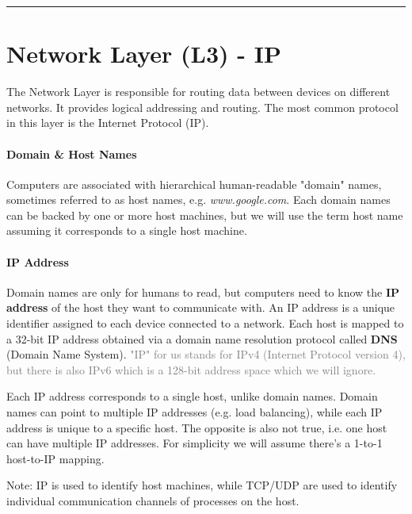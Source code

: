 \documentclass[openany,12pt]{book}
\newcommand{\gray}[1]{\textcolor{gray}{#1}}
\begin{document}
\noindent\rule{\linewidth}{0.5pt}



\section*{Network Layer (L3) - IP}

The Network Layer is responsible for routing data between devices on different networks. It provides logical addressing and routing. The most common protocol in this layer is the Internet Protocol (IP).

\paragraph{Domain \& Host Names} Computers are associated with hierarchical human-readable "domain" names, sometimes referred to as host names, e.g. \textit{www.google.com}. Each domain names can be backed by one or more host machines, but we will use the term host name assuming it corresponds to a single host machine.


\paragraph{IP Address} Domain names are only for humans to read, but computers need to know the \textbf{IP address} of the host they want to communicate with. An IP address is a unique identifier assigned to each device connected to a network. Each host is mapped to a 32-bit IP address obtained via a domain name resolution protocol called \textbf{DNS} (Domain Name System). \gray{"IP" for us stands for IPv4 (Internet Protocol version 4), but there is also IPv6 which is a 128-bit address space which we will ignore.}

Each IP address corresponds to a single host, unlike domain names. Domain names can point to multiple IP addresses (e.g. load balancing), while each IP address is unique to a specific host. The opposite is also not true, i.e. one host can have multiple IP addresses. For simplicity we will assume there's a 1-to-1 host-to-IP mapping.

Note: IP is used to identify host machines, while TCP/UDP are used to identify individual communication channels of processes on the host.
\end{document}
